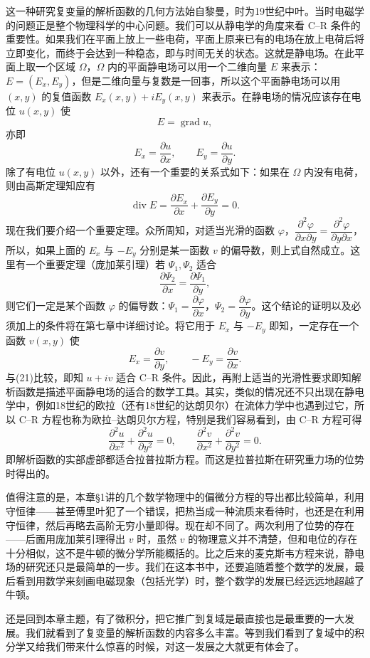 这一种研究复变量的解析函数的几何方法始自黎曼，时为19世纪中叶。当时电磁学的问题正是整个物理科学的中心问题。我们可以从静电学的角度来看 C--R 条件的重要性。如果我们在平面上放上一些电荷，平面上原来已有的电场在放上电荷后将立即变化，而终于会达到一种稳态，即与时间无关的状态。这就是静电场。在此平面上取一个区域 $\Omega$，$\Omega$ 内的平面静电场可以用一个二维向量 $E$ 来表示：$E=(E_x,E_y)$，但是二维向量与复数是一回事，所以这个平面静电场可以用 $(x,y)$ 的复值函数 $E_x(x,y)+iE_y(x,y)$ 来表示。在静电场的情况应该存在电位 $u(x,y)$ 使
\begin{equation}
 E=\operatorname{grad}u,
 \tag{20}
\end{equation}
亦即
\begin{equation}
 E_x=\frac{\partial u}{\partial x},\qquad E_y=\frac{\partial u}{\partial y}.
 \tag{21}
\end{equation}
除了有电位 $u(x,y)$ 以外，还有一个重要的关系式如下：如果在 $\Omega$ 内没有电荷，则由高斯定理知应有
\begin{equation}
 \operatorname{div}E=\frac{\partial E_x}{\partial x}+\frac{\partial E_y}{\partial y}=0.
 \tag{22}
\end{equation}
现在我们要介绍一个重要定理。众所周知，对适当光滑的函数 $\varphi$，$\dfrac{\partial^2\varphi}{\partial x\partial y}=\dfrac{\partial^2\varphi}{\partial y\partial x}$，所以，如果上面的 $E_x$ 与 $-E_y$ 分别是某一函数 $v$ 的偏导数，则上式自然成立。这里有一个重要定理（庞加莱引理）若 $\Psi_1,\Psi_2$ 适合
\[
 \frac{\partial\Psi_2}{\partial x}=\frac{\partial\Psi_1}{\partial y},
\]
则它们一定是某个函数 $\varphi$ 的偏导数：$\Psi_1=\dfrac{\partial\varphi}{\partial x}$，$\Psi_2=\dfrac{\partial\varphi}{\partial y}$。这个结论的证明以及必须加上的条件将在第七章中详细讨论。将它用于 $E_x$ 与 $-E_y$ 即知，一定存在一个函数 $v(x,y)$ 使
\begin{equation}
 E_x=\frac{\partial v}{\partial y},\qquad -E_y=\frac{\partial v}{\partial x}.
 \tag{23}
\end{equation}
与(21)比较，即知 $u+iv$ 适合 C--R 条件。因此，再附上适当的光滑性要求即知解析函数是描述平面静电场的适合的数学工具。其实，类似的情况还不只出现在静电学中，例如18世纪的欧拉（还有18世纪的达朗贝尔）在流体力学中也遇到过它，所以 C--R 方程也称为欧拉--达朗贝尔方程，特别是我们容易看到，由 C--R 方程可得
\[
 \frac{\partial^2u}{\partial x^2}+\frac{\partial^2u}{\partial y^2}=0,
 \qquad
 \frac{\partial^2v}{\partial x^2}+\frac{\partial^2v}{\partial y^2}=0.
\]
即解析函数的实部虚部都适合拉普拉斯方程。而这是拉普拉斯在研究重力场的位势时得出的。

值得注意的是，本章§1讲的几个数学物理中的偏微分方程的导出都比较简单，利用守恒律——甚至傅里叶犯了一个错误，把热当成一种流质来看待时，也还是在利用守恒律，然后再略去高阶无穷小量即得。现在却不同了。两次利用了位势的存在——后面用庞加莱引理得出 $v$ 时，虽然 $v$ 的物理意义并不清楚，但和电位的存在十分相似，这不是牛顿的微分学所能概括的。比之后来的麦克斯韦方程来说，静电场的研究还只是最简单的一步。我们在这本书中，还要追随着整个数学的发展，最后看到用数学来刻画电磁现象（包括光学）时，整个数学的发展已经远远地超越了牛顿。

还是回到本章主题，有了微积分，把它推广到复域是最直接也是最重要的一大发展。我们就看到了复变量的解析函数的内容多么丰富。等到我们看到了复域中的积分学又给我们带来什么惊喜的时候，对这一发展之大就更有体会了。

